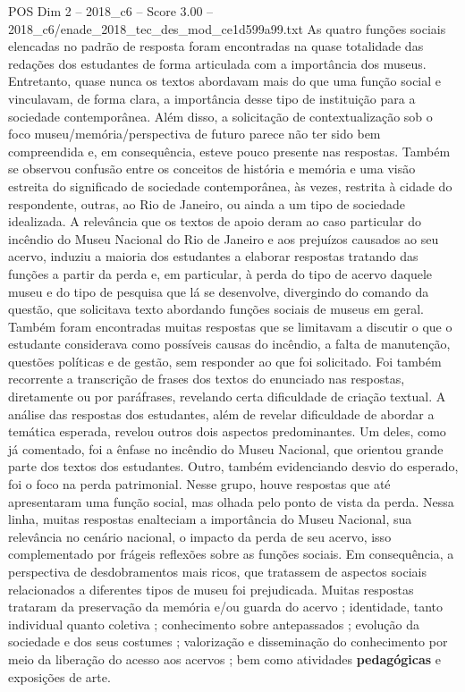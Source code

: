 \begin{textsample}{POS Dim 2 – 2018\_c6 – Score 3.00 – 2018\_c6/enade\_2018\_tec\_des\_mod\_ce1d599a99.txt}
As quatro funções sociais elencadas no padrão de resposta foram encontradas na quase totalidade das redações dos estudantes de forma articulada com a importância dos museus.
Entretanto, quase nunca os textos abordavam mais do que uma função social e vinculavam, de forma clara, a importância desse tipo de instituição para a sociedade contemporânea.
Além disso, a solicitação de contextualização sob o foco museu/memória/perspectiva de futuro parece não ter sido bem compreendida e, em consequência, esteve pouco presente nas respostas.
Também se observou confusão entre os conceitos de história e memória e uma visão estreita do significado de sociedade contemporânea, às vezes, restrita à cidade do respondente, outras, ao Rio de Janeiro, ou ainda a um tipo de sociedade idealizada.
A relevância que os textos de apoio deram ao caso particular do incêndio do Museu Nacional do Rio de Janeiro e aos prejuízos causados ao seu acervo, induziu a maioria dos estudantes a elaborar respostas tratando das funções a partir da perda e, em particular, à perda do tipo de acervo daquele museu e do tipo de pesquisa que lá se desenvolve, divergindo do comando da questão, que solicitava texto abordando funções sociais de museus em geral.
Também foram encontradas muitas respostas que se limitavam a discutir o que o estudante considerava como possíveis causas do incêndio, a falta de manutenção, questões políticas e de gestão, sem responder ao que foi solicitado.
Foi também recorrente a transcrição de frases dos textos do enunciado nas respostas, diretamente ou por paráfrases, revelando certa dificuldade de criação textual.
A análise das respostas dos estudantes, além de revelar dificuldade de abordar a temática esperada, revelou outros dois aspectos predominantes.
Um deles, como já comentado, foi a ênfase no incêndio do Museu Nacional, que orientou grande parte dos textos dos estudantes.
Outro, também evidenciando desvio do esperado, foi o foco na perda patrimonial.
Nesse grupo, houve respostas que até apresentaram uma função social, mas olhada pelo ponto de vista da perda.
Nessa linha, muitas respostas enalteciam a importância do Museu Nacional, sua relevância no cenário nacional, o impacto da perda de seu acervo, isso complementado por frágeis reflexões sobre as funções sociais.
Em consequência, a perspectiva de desdobramentos mais ricos, que tratassem de aspectos sociais relacionados a diferentes tipos de museu foi prejudicada.
Muitas respostas trataram da preservação da memória e/ou guarda do acervo ; identidade, tanto individual quanto coletiva ; conhecimento sobre antepassados ; evolução da sociedade e dos seus costumes ; valorização e disseminação do conhecimento por meio da liberação do acesso aos acervos ; bem como atividades \textbf{pedagógicas} e exposições de arte.

\end{textsample}

